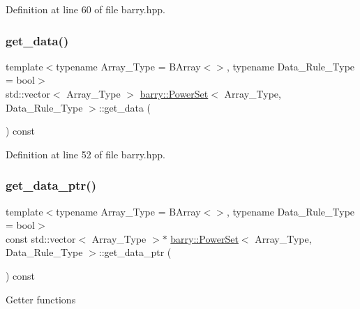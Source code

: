 Definition at line 60 of file barry.\+hpp.

\mbox{\label{classbarry_1_1_power_set_a53ca37c9cb14abd6f61bc0127ac9d067}} 
\subsubsection{\texorpdfstring{get\+\_\+data()}{get\_data()}}
{\footnotesize\ttfamily template$<$typename Array\+\_\+\+Type  = B\+Array$<$$>$, typename Data\+\_\+\+Rule\+\_\+\+Type  = bool$>$ \\
std\+::vector$<$ Array\+\_\+\+Type $>$ \hyperlink{classbarry_1_1_power_set}{barry\+::\+Power\+Set}$<$ Array\+\_\+\+Type, Data\+\_\+\+Rule\+\_\+\+Type $>$\+::get\+\_\+data (\begin{DoxyParamCaption}{ }\end{DoxyParamCaption}) const\hspace{0.3cm}{\ttfamily [inline]}}



Definition at line 52 of file barry.\+hpp.

\mbox{\label{classbarry_1_1_power_set_a80b283b1ac115f1be049a09f1a69586a}} 
\subsubsection{\texorpdfstring{get\+\_\+data\+\_\+ptr()}{get\_data\_ptr()}}
{\footnotesize\ttfamily template$<$typename Array\+\_\+\+Type  = B\+Array$<$$>$, typename Data\+\_\+\+Rule\+\_\+\+Type  = bool$>$ \\
const std\+::vector$<$ Array\+\_\+\+Type $>$$\ast$ \hyperlink{classbarry_1_1_power_set}{barry\+::\+Power\+Set}$<$ Array\+\_\+\+Type, Data\+\_\+\+Rule\+\_\+\+Type $>$\+::get\+\_\+data\+\_\+ptr (\begin{DoxyParamCaption}{ }\end{DoxyParamCaption}) const\hspace{0.3cm}{\ttfamily [inline]}}

Getter functions 

